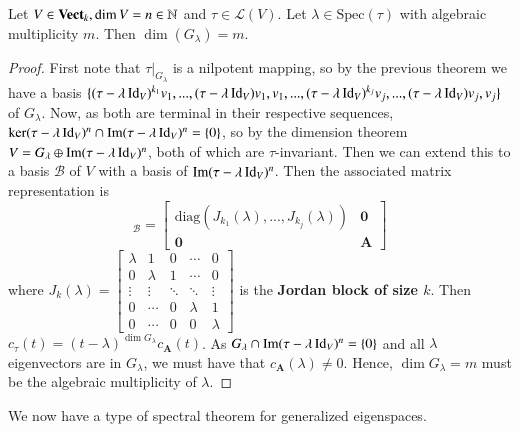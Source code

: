 \begin{theorem}
    Let $V \in \normalfont\textbf{Vect}_{k},\dim V = n\in \mathbb N$ and $\tau \in \mathcal{L}(V)$. Let $\lambda \in\text{Spec}(\tau)$ with algebraic multiplicity $m$. Then $\dim(G_{\lambda}) = m$.
\end{theorem}
\begin{proof}
    First note that $\tau\vert_{G_{\lambda}}$ is a nilpotent mapping, so by the previous theorem we have a basis $\{(\tau-\lambda\operatorname{Id}_V)^{k_1}v_1,...,(\tau-\lambda\operatorname{Id}_V)v_1,v_1,...,(\tau-\lambda\operatorname{Id}_V)^{k_j}v_j,...,(\tau-\lambda\operatorname{Id}_V)v_j,v_j\}$ of $G_{\lambda}$. Now, as both are terminal in their respective sequences, $\ker(\tau-\lambda\operatorname{Id}_V)^n\cap\operatorname{Im}(\tau-\lambda\operatorname{Id}_V)^n = \{0\}$, so by the dimension theorem $V = G_{\lambda}\oplus \operatorname{Im}(\tau-\lambda\operatorname{Id}_V)^n$, both of which are $\tau$-invariant. Then we can extend this to a basis $\mathcal{B}$ of $V$ with a basis of $\operatorname{Im}(\tau-\lambda \operatorname{Id}_V)^n$. Then the associated matrix representation is \begin{equation*}
        [\tau]_{\mathcal{B}} = \left[\begin{array}{c|c} \text{diag}(J_{k_1}(\lambda),...,J_{k_j}(\lambda)) & \mathbf{0} \\ \mathbf{0} & \mathbf{A}\end{array}\right]
    \end{equation*}
    where $J_k(\lambda) = \begin{bmatrix} \lambda & 1 & 0&  \cdots & 0 \\ 0 & \lambda & 1 & \cdots & 0 \\ \vdots & \vdots & \ddots & \ddots & \vdots \\ 0 & \cdots & 0 & \lambda & 1 \\ 0 & \cdots & 0 & 0 & \lambda \end{bmatrix}$ is the \textbf{Jordan block of size $k$}. Then $c_{\tau}(t) = (t-\lambda)^{\dim G_{\lambda}}c_{\mathbf{A}}(t)$. As $G_{\lambda}\cap \operatorname{Im}(\tau-\lambda\operatorname{Id}_V)^n = \{0\}$ and all $\lambda$ eigenvectors are in $G_{\lambda}$, we must have that $c_{\mathbf{A}}(\lambda) \neq 0$. Hence, $\dim G_{\lambda} = m$ must be the algebraic multiplicity of $\lambda$.
\end{proof}

We now have a type of spectral theorem for generalized eigenspaces.

